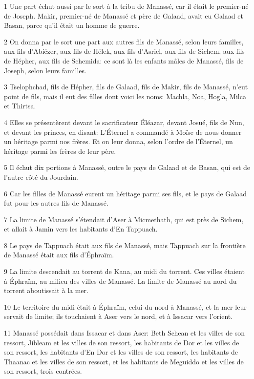 \par 1 Une part échut aussi par le sort à la tribu de Manassé, car il était le premier-né de Joseph. Makir, premier-né de Manassé et père de Galaad, avait eu Galaad et Basan, parce qu'il était un homme de guerre.
\par 2 On donna par le sort une part aux autres fils de Manassé, selon leurs familles, aux fils d'Abiézer, aux fils de Hélek, aux fils d'Asriel, aux fils de Sichem, aux fils de Hépher, aux fils de Schemida: ce sont là les enfants mâles de Manassé, fils de Joseph, selon leurs familles.
\par 3 Tselophchad, fils de Hépher, fils de Galaad, fils de Makir, fils de Manassé, n'eut point de fils, mais il eut des filles dont voici les noms: Machla, Noa, Hogla, Milca et Thirtsa.
\par 4 Elles se présentèrent devant le sacrificateur Éléazar, devant Josué, fils de Nun, et devant les princes, en disant: L'Éternel a commandé à Moïse de nous donner un héritage parmi nos frères. Et on leur donna, selon l'ordre de l'Éternel, un héritage parmi les frères de leur père.
\par 5 Il échut dix portions à Manassé, outre le pays de Galaad et de Basan, qui est de l'autre côté du Jourdain.
\par 6 Car les filles de Manassé eurent un héritage parmi ses fils, et le pays de Galaad fut pour les autres fils de Manassé.
\par 7 La limite de Manassé s'étendait d'Aser à Micmethath, qui est près de Sichem, et allait à Jamin vers les habitants d'En Tappuach.
\par 8 Le pays de Tappuach était aux fils de Manassé, mais Tappuach sur la frontière de Manassé était aux fils d'Éphraïm.
\par 9 La limite descendait au torrent de Kana, au midi du torrent. Ces villes étaient à Éphraïm, au milieu des villes de Manassé. La limite de Manassé au nord du torrent aboutissait à la mer.
\par 10 Le territoire du midi était à Éphraïm, celui du nord à Manassé, et la mer leur servait de limite; ils touchaient à Aser vers le nord, et à Issacar vers l'orient.
\par 11 Manassé possédait dans Issacar et dans Aser: Beth Schean et les villes de son ressort, Jibleam et les villes de son ressort, les habitants de Dor et les villes de son ressort, les habitants d'En Dor et les villes de son ressort, les habitants de Thaanac et les villes de son ressort, et les habitants de Meguiddo et les villes de son ressort, trois contrées.
